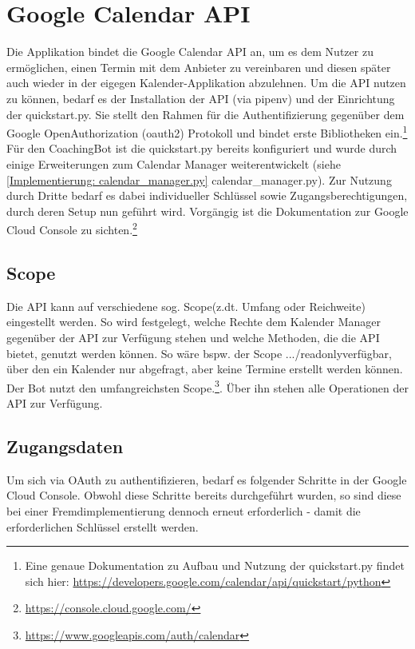         
    \section{Google Calendar API} \label{Grundlagen: Google Calendar API}
        Die Applikation bindet die Google Calendar API \cite{googleCalAPI} an, um es dem Nutzer zu ermöglichen, einen Termin mit dem Anbieter zu vereinbaren und diesen später auch wieder in der eigegen Kalender-Applikation abzulehnen.
        Um die API nutzen zu können, bedarf es der Installation der API (via pipenv) und der Einrichtung der quickstart.py. Sie stellt den Rahmen für die Authentifizierung gegenüber dem Google Open\-Authorization (oauth2) Protokoll und bindet erste Bibliotheken ein.\footnote{Eine genaue Dokumentation zu Aufbau und Nutzung der quickstart.py findet sich hier: \url{https://developers.google.com/calendar/api/quickstart/python}}
        Für den CoachingBot ist die quickstart.py bereits konfiguriert und wurde durch einige Erweiterungen zum Calendar Manager weiterentwickelt (siehe \ref{Implementierung: calendar_manager.py} calendar\_manager.py). Zur Nutzung durch Dritte bedarf es dabei individueller Schlüssel sowie Zugangsberechtigungen, durch deren Setup nun geführt wird. Vorgängig ist die Dokumentation zur Google Cloud Console zu sichten.\footnote{\url{https://console.cloud.google.com/}}
        
        \subsection{Scope}
            Die API kann auf verschiedene sog. \glq Scope\grq (z.dt. Umfang oder Reichweite) eingestellt werden. So wird festgelegt, welche Rechte dem Kalender Manager gegenüber der API zur Verfügung stehen und welche Methoden, die die API bietet, genutzt werden können. So wäre bspw. der Scope \glqq.../readonly\grqq verfügbar, über den ein Kalender nur abgefragt, aber keine Termine erstellt werden können. Der Bot nutzt den umfangreichsten Scope.\footnote{\url{https://www.googleapis.com/auth/calendar}}. Über ihn stehen alle Operationen der API zur Verfügung.
        
        \subsection{Zugangsdaten}
            Um sich via OAuth zu authentifizieren, bedarf es folgender Schritte in der Google Cloud Console. Obwohl diese Schritte bereits durchgeführt wurden, so sind diese bei einer Fremdimplementierung dennoch erneut erforderlich - damit die erforderlichen Schlüssel erstellt werden. 
        

